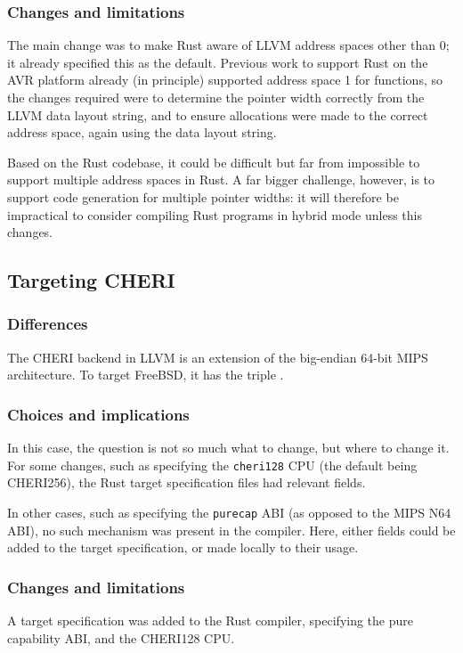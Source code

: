 \documentclass[dissertation.tex]{subfiles}
\begin{document}
\subsubsection{Changes and limitations}
The main change was to make Rust aware of LLVM address spaces other than
0; it already specified this as the default.
Previous work to support Rust on the AVR platform already (in principle)
supported address space 1 for functions, so the changes required were to
determine the pointer width correctly from the LLVM data layout string,
and to ensure allocations were made to the correct address space, again
using the data layout string.

Based on the Rust codebase, it could be difficult but far from
impossible to support multiple address spaces in Rust.
A far bigger challenge, however, is to support code generation for
multiple pointer widths: it will therefore be impractical to consider
compiling Rust programs in hybrid mode unless this changes.


\subsection{Targeting CHERI}
\label{sec:impl-cheritarget}

\subsubsection{Differences}
The CHERI backend in LLVM is an extension of the big-endian 64-bit MIPS
architecture.
To target FreeBSD, it has the triple \cuf.

\subsubsection{Choices and implications}
In this case, the question is not so much what to change, but where to
change it.
For some changes, such as specifying the \texttt{cheri128} CPU (the
default being CHERI256), the Rust target specification files had
relevant fields.

In other cases, such as specifying the \texttt{purecap} ABI (as opposed
to the MIPS N64 ABI), no such mechanism was present in the compiler.
Here, either fields could be added to the target specification, or made
locally to their usage.


\subsubsection{Changes and limitations}
A target specification was added to the Rust compiler, specifying the
pure capability ABI, and the CHERI128 CPU.
\end{document}
